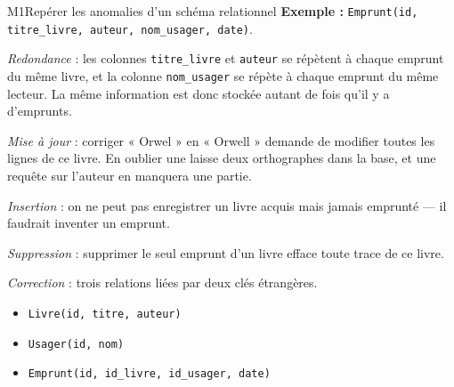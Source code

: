 \begin{fichemethode}{M1}{Repérer les anomalies d'un schéma relationnel}
\textbf{Exemple :} \texttt{Emprunt(id, titre\_livre, auteur, nom\_usager, date)}.

\emph{Redondance} : les colonnes \texttt{titre\_livre} et \texttt{auteur} se répètent à
chaque emprunt du même livre, et la colonne \texttt{nom\_usager} se répète à chaque emprunt
du même lecteur. La même information est donc stockée autant de fois qu'il y a d'emprunts.

\emph{Mise à jour} : corriger « Orwel » en « Orwell » demande de modifier toutes les lignes de
ce livre. En oublier une laisse deux orthographes dans la base, et une requête sur l'auteur en
manquera une partie.

\emph{Insertion} : on ne peut pas enregistrer un livre acquis mais jamais emprunté — il
faudrait inventer un emprunt.

\emph{Suppression} : supprimer le seul emprunt d'un livre efface toute trace de ce livre.

\emph{Correction} : trois relations liées par deux clés étrangères.
\begin{itemize}
  \item \texttt{Livre(id, titre, auteur)}
  \item \texttt{Usager(id, nom)}
  \item \texttt{Emprunt(id, id\_livre, id\_usager, date)}
\end{itemize}


\end{fichemethode}
